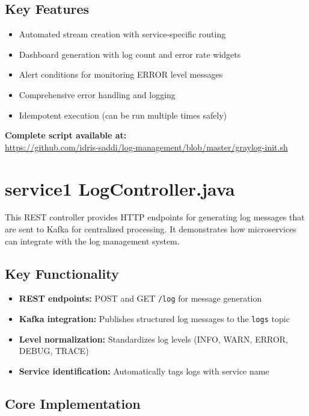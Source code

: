 \documentclass[12pt,a4paper]{report}
\begin{document}
\section*{Key Features}
\begin{itemize}
\item Automated stream creation with service-specific routing
\item Dashboard generation with log count and error rate widgets  
\item Alert conditions for monitoring ERROR level messages
\item Comprehensive error handling and logging
\item Idempotent execution (can be run multiple times safely)
\end{itemize}

\textbf{Complete script available at:} \\
\url{https://github.com/idris-saddi/log-management/blob/master/graylog-init.sh}

\chapter{service1 LogController.java}

This REST controller provides HTTP endpoints for generating log messages that are sent to Kafka for centralized processing. It demonstrates how microservices can integrate with the log management system.

\section*{Key Functionality}

\begin{itemize}
\item \textbf{REST endpoints:} POST and GET \texttt{/log} for message generation
\item \textbf{Kafka integration:} Publishes structured log messages to the \texttt{logs} topic
\item \textbf{Level normalization:} Standardizes log levels (INFO, WARN, ERROR, DEBUG, TRACE)
\item \textbf{Service identification:} Automatically tags logs with service name
\end{itemize}

\section*{Core Implementation}
\end{document}
